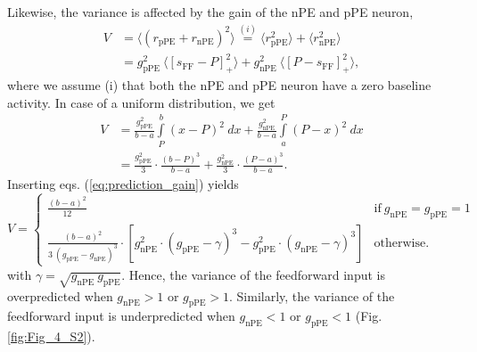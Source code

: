 \documentclass[10pt,a4paper,draft]{article}
\begin{document}
Likewise, the variance is affected by the gain of the nPE and pPE neuron,
%
\begin{align}
\label{eq:condition_variance_gain}
V &= \langle \left(r_\mathrm{pPE} + r_\mathrm{nPE}\right)^2 \rangle \overset{(i)}{=} \langle r_\mathrm{pPE}^2 \rangle + \langle r_\mathrm{nPE}^2 \rangle \nonumber\\
&=g_\mathrm{pPE}^2\ \langle \left[ s_\mathrm{FF}-P \right]_+^2 \rangle + g_\mathrm{nPE}^2\ \langle \left[ P-s_\mathrm{FF} \right]_+^2 \rangle,
\end{align}
%
where we assume (i) that both the nPE and pPE neuron have a zero baseline activity. In case of a uniform distribution, we get
%
\begin{align}
V &= \frac{g_\mathrm{pPE}^2}{b-a} \int\limits_P^b (x-P)^2\ dx + \frac{g_\mathrm{nPE}^2}{b-a} \int\limits_a^P (P-x)^2\ dx \\
   &= \frac{g_\mathrm{pPE}^2}{3} \cdot \frac{(b-P)^3}{b-a} + \frac{g_\mathrm{nPE}^2}{3} \cdot \frac{(P-a)^3}{b-a}. \nonumber
\end{align}
%
Inserting eqs. (\ref{eq:prediction_gain}) yields
%
\begin{equation}
\label{eq:variance_gain}
    V=
    \begin{cases}
      \frac{(b - a)^2}{12} & \text{if}\ g_\mathrm{nPE} = g_\mathrm{pPE} = 1 \\
      \frac{(b-a)^2}{3\ (g_\mathrm{pPE} - g_\mathrm{nPE})^3} \cdot \left[ g_\mathrm{nPE}^2 \cdot( g_\mathrm{pPE} - \gamma)^3 - g_\mathrm{pPE}^2 \cdot (g_\mathrm{nPE} - \gamma)^3\right] & \text{otherwise.}
    \end{cases}
\end{equation}
%
with $\gamma = \sqrt{g_\mathrm{nPE}\ g_\mathrm{pPE}}$. Hence, the variance of the feedforward input is overpredicted when $g_\mathrm{nPE}>1$ or $g_\mathrm{pPE}>1$. Similarly, the variance of the feedforward input is underpredicted when $g_\mathrm{nPE} < 1$ or $g_\mathrm{pPE} < 1$ (Fig. \ref{fig:Fig_4_S2}).
\end{document}
